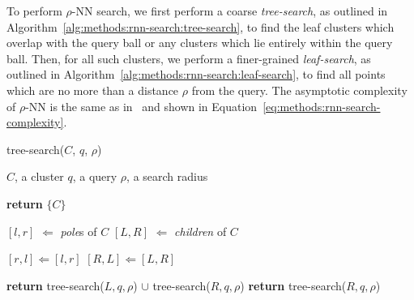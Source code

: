 To perform $\rho$-NN search, we first perform a coarse \textit{tree-search}, as outlined in Algorithm~\ref{alg:methods:rnn-search:tree-search}, to find the leaf clusters which overlap with the query ball or any clusters which lie entirely within the query ball.
Then, for all such clusters, we perform a finer-grained \textit{leaf-search}, as outlined in Algorithm~\ref{alg:methods:rnn-search:leaf-search}, to find all points which are no more than a distance $\rho$ from the query.
The asymptotic complexity of $\rho$-NN is the same as in~\cite{ishaq2019clustered} and shown in Equation~\ref{eq:methods:rnn-search-complexity}.

\begin{minipage}{0.6\textwidth}
\begin{algorithm}[H]
    \caption{tree-search($C$, $q$, $\rho$)}
    \label{alg:methods:rnn-search:tree-search}
    \begin{tiny}
    \begin{algorithmic}[0]
        \Require $C$, a cluster
        \Require $q$, a query
        \Require $\rho$, a search radius

            \State \textbf{return} $\{C\}$
        \Else

            \State $[l, r]$ $\Leftarrow$ \textit{pole}s of $C$
            \State $[L, R]$ $\Leftarrow$ \textit{children} of $C$

                \State $[r, l] \Leftarrow [l, r]$
                \State $[R, L] \Leftarrow [L, R]$
            \EndIf

                \State \textbf{return} tree-search($L, q, \rho$) $\cup$ tree-search($R, q, \rho$)
            \Else
                \State \textbf{return} tree-search($R, q, \rho$)
            \EndIf
        \EndIf
    \end{algorithmic}
    \end{tiny}
\end{algorithm}
\end{minipage}
\hfill
